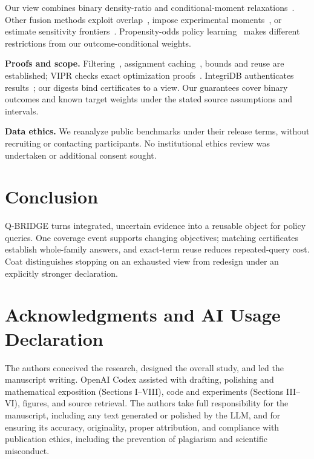 \documentclass[conference]{IEEEtran}
\begin{document}
Our view combines binary density-ratio and conditional-moment relaxations~\cite{dorn2025dvds,ishikawa2026convex}. Other fusion methods exploit overlap~\cite{jiang2024overlap}, impose experimental moments~\cite{du2026feasible}, or estimate sensitivity frontiers~\cite{lanners2025fusion}. Propensity-odds policy learning~\cite{Kallus2018ConfoundingRobust,Hess2026SharpPolicy} makes different restrictions from our outcome-conditional weights.


\textbf{Proofs and scope.} Filtering~\cite{Bartels2023Filters}, assignment caching~\cite{Cadar2008KLEE}, bounds and reuse are established; VIPR checks exact optimization proofs~\cite{Cheung2017VIPR}. IntegriDB authenticates results~\cite{Zhang2015IntegriDB}; our digests bind certificates to a view. Our guarantees cover binary outcomes and known target weights under the stated source assumptions and intervals.

\textbf{Data ethics.} We reanalyze public benchmarks under their release terms, without recruiting or contacting participants. No institutional ethics review was undertaken or additional consent sought.

\section{Conclusion}
Q-BRIDGE turns integrated, uncertain evidence into a reusable object for policy queries. One coverage event supports changing objectives; matching certificates establish whole-family answers, and exact-term reuse reduces repeated-query cost. Coat distinguishes stopping on an exhausted view from redesign under an explicitly stronger declaration.

\clearpage
\section*{Acknowledgments and AI Usage Declaration}
The authors conceived the research, designed the overall study, and led the manuscript writing. OpenAI Codex assisted with drafting, polishing and mathematical exposition (Sections I--VIII), code and experiments (Sections III--VI), figures, and source retrieval. The authors take full responsibility for the manuscript, including any text generated or polished by the LLM, and for ensuring its accuracy, originality, proper attribution, and compliance with publication ethics, including the prevention of plagiarism and scientific misconduct.



\end{document}
